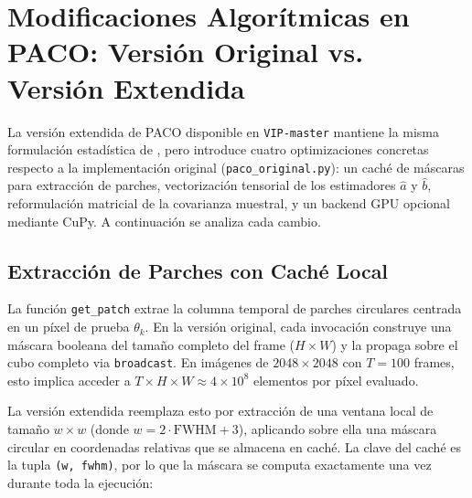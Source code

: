 
\section{Modificaciones Algorítmicas en PACO: Versión Original vs. Versión Extendida}
\label{sec:paco_diff}

La versión extendida de PACO disponible en \texttt{VIP-master} mantiene la misma formulación estadística de \citet{Flasseur_2018}, pero introduce cuatro optimizaciones concretas respecto a la implementación original (\texttt{paco\_original.py}): un caché de máscaras para extracción de parches, vectorización tensorial de los estimadores $\hat{a}$ y $\hat{b}$, reformulación matricial de la covarianza muestral, y un backend GPU opcional mediante CuPy. A continuación se analiza cada cambio.

\subsection{Extracción de Parches con Caché Local}

La función \texttt{get\_patch} extrae la columna temporal de parches circulares centrada en un píxel de prueba $\theta_k$. En la versión original, cada invocación construye una máscara booleana del tamaño completo del frame ($H \times W$) y la propaga sobre el cubo completo via \texttt{broadcast}. En imágenes de $2048 \times 2048$ con $T=100$ frames, esto implica acceder a $T \times H \times W \approx 4 \times 10^8$ elementos por píxel evaluado.

La versión extendida reemplaza esto por extracción de una ventana local de tamaño $w \times w$ (donde $w = 2 \cdot \text{FWHM} + 3$), aplicando sobre ella una máscara circular en coordenadas relativas que se almacena en caché. La clave del caché es la tupla \texttt{(w, fwhm)}, por lo que la máscara se computa exactamente una vez durante toda la ejecución:

